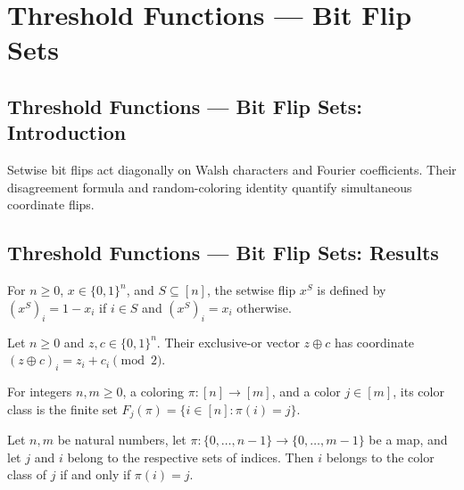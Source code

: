 \section{Threshold Functions --- Bit Flip Sets}
\subsection*{Threshold Functions --- Bit Flip Sets: Introduction}
Setwise bit flips act diagonally on Walsh characters and Fourier coefficients. Their disagreement formula and random-coloring identity quantify simultaneous coordinate flips.

\subsection*{Threshold Functions --- Bit Flip Sets: Results}

\begin{definition}
\leanok
{}
For $n\ge0$, $x\in\{0,1\}^n$, and $S\subseteq[n]$, the setwise flip $x^S$ is defined by $(x^S)_i=1-x_i$ if $i\in S$ and $(x^S)_i=x_i$ otherwise.
\end{definition}

\begin{definition}
\leanok
{}
Let $n\ge0$ and $z,c\in\{0,1\}^n$. Their exclusive-or vector $z\oplus c$ has coordinate $(z\oplus c)_i=z_i+c_i\pmod2$.
\end{definition}

\begin{definition}
\leanok
For integers $n,m\ge0$, a coloring $\pi\colon[n]\to[m]$, and a color $j\in[m]$, its color class is the finite set $F_j(\pi)=\{i\in[n]:\pi(i)=j\}$.
\end{definition}

\begin{lemma}
\leanok
{}
Let $n,m$ be natural numbers, let $\pi:\{0,\ldots,n-1\}\to\{0,\ldots,m-1\}$ be a
map, and let $j$ and $i$ belong to the respective sets of indices. Then $i$ belongs to
the color class of $j$ if and only if $\pi(i)=j$.
\end{lemma}

